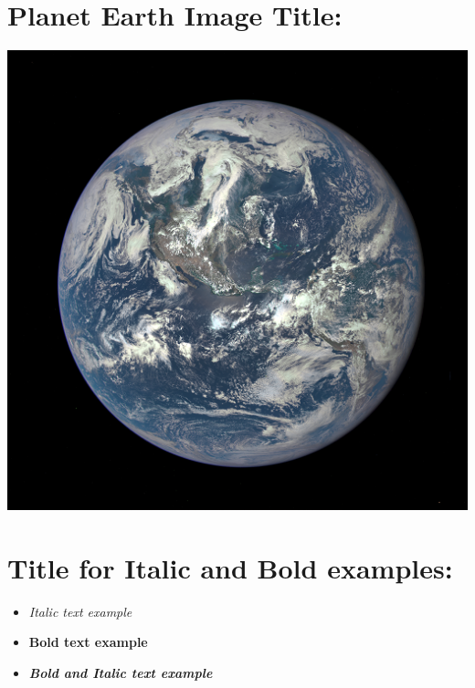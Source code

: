 \documentclass[12pt]{article} %
\begin{document}
\section*{Planet Earth Image Title:}
\begin{flushleft}
\includegraphics{earth.png} %
\end{flushleft}


\newpage


\section*{Title for Italic and Bold examples:}
\begin{flushleft}
\begin{itemize}
\item\textit{Italic text example}\\
\item\textbf{Bold text example}\\
\item\textit{\textbf{Bold and Italic text example}}\\
\end{itemize}
\end{flushleft}


\end{document}
